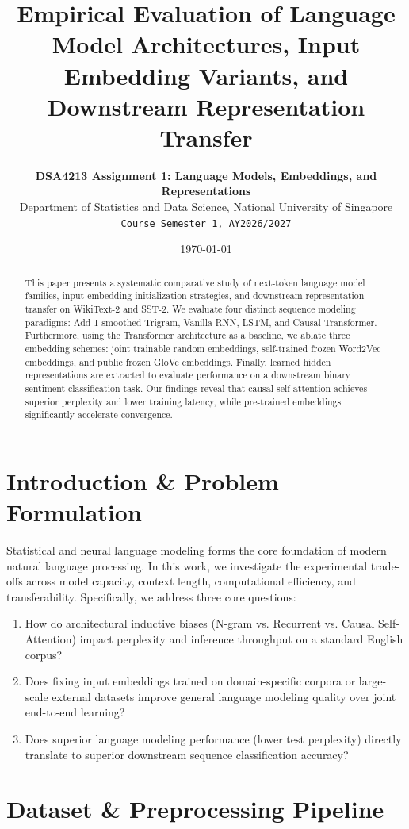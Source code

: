 \documentclass[10pt,twocolumn,3 authorization]{article}
\title{\Large \bf Empirical Evaluation of Language Model Architectures, Input Embedding Variants, and Downstream Representation Transfer}
\author{
    \textbf{DSA4213 Assignment 1: Language Models, Embeddings, and Representations} \\
    Department of Statistics and Data Science, National University of Singapore \\
    \texttt{Course Semester 1, AY2026/2027}
}
\date{\today}
\begin{document}
\maketitle

\begin{abstract}
This paper presents a systematic comparative study of next-token language model families, input embedding initialization strategies, and downstream representation transfer on WikiText-2 and SST-2. We evaluate four distinct sequence modeling paradigms: Add-1 smoothed Trigram, Vanilla RNN, LSTM, and Causal Transformer. Furthermore, using the Transformer architecture as a baseline, we ablate three embedding schemes: joint trainable random embeddings, self-trained frozen Word2Vec embeddings, and public frozen GloVe embeddings. Finally, learned hidden representations are extracted to evaluate performance on a downstream binary sentiment classification task. Our findings reveal that causal self-attention achieves superior perplexity and lower training latency, while pre-trained embeddings significantly accelerate convergence.
\end{abstract}

\section{Introduction \& Problem Formulation}
Statistical and neural language modeling forms the core foundation of modern natural language processing. In this work, we investigate the experimental trade-offs across model capacity, context length, computational efficiency, and transferability. Specifically, we address three core questions:
\begin{enumerate}
    \item How do architectural inductive biases (N-gram vs. Recurrent vs. Causal Self-Attention) impact perplexity and inference throughput on a standard English corpus?
    \item Does fixing input embeddings trained on domain-specific corpora or large-scale external datasets improve general language modeling quality over joint end-to-end learning?
    \item Does superior language modeling performance (lower test perplexity) directly translate to superior downstream sequence classification accuracy?
\end{enumerate}

\section{Dataset \& Preprocessing Pipeline}
\end{document}

